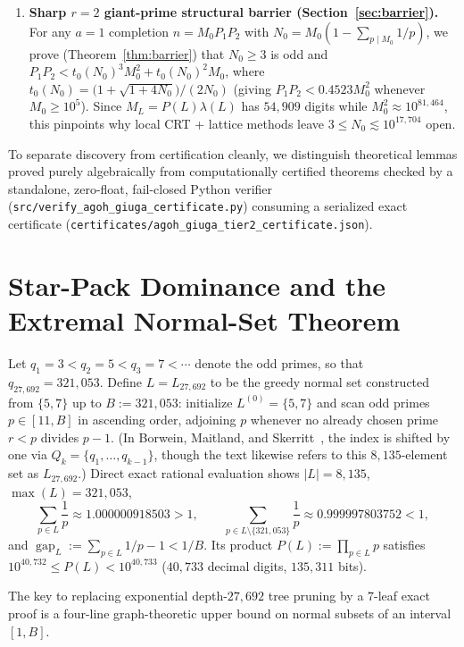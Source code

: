 \documentclass[11pt]{article}
\theoremstyle{remark}
\newcommand{\gap}{\operatorname{gap}}
\begin{document}
\begin{enumerate}
  \item \textbf{Sharp $r=2$ giant-prime structural barrier
  (Section~\ref{sec:barrier}).} For any $a = 1$ completion $n = M_0 P_1 P_2$
  with $N_0 = M_0(1 - \sum_{p\mid M_0} 1/p)$, we prove
  (Theorem~\ref{thm:barrier}) that $N_0 \ge 3$ is odd and
  $P_1 P_2 < t_0(N_0)^3 M_0^2 + t_0(N_0)^2 M_0$, where
  $t_0(N_0) = \bigl(1 + \sqrt{1+4N_0}\bigr)/(2N_0)$ (giving
  $P_1 P_2 < 0.4523 M_0^2$ whenever $M_0 \ge 10^5$). Since
  $M_L = P(L)\lambda(L)$ has $54{,}909$ digits while $M_0^2 \approx 10^{81{,}464}$,
  this pinpoints why local CRT + lattice methods leave
  $3 \le N_0 \lesssim 10^{17{,}704}$ open.
\end{enumerate}

To separate discovery from certification cleanly, we distinguish theoretical
lemmas proved purely algebraically from computationally certified theorems
checked by a standalone, zero-float, fail-closed Python verifier
(\texttt{src/verify\_agoh\_giuga\_certificate.py}) consuming a serialized exact
certificate (\texttt{certificates/agoh\_giuga\_tier2\_certificate.json}).

\section{Star-Pack Dominance and the Extremal Normal-Set Theorem}
\label{sec:starpack}

Let $q_1 = 3 < q_2 = 5 < q_3 = 7 < \cdots$ denote the odd primes, so that
$q_{27,692} = 321{,}053$. Define $L = L_{27,692}$ to be the greedy normal set
constructed from $\{5,7\}$ up to $B := 321{,}053$: initialize $L^{(0)} = \{5,7\}$
and scan odd primes $p \in [11, B]$ in ascending order, adjoining $p$ whenever
no already chosen prime $r < p$ divides $p - 1$. (In Borwein, Maitland, and
Skerritt~\cite[Definition~11]{DBLP:journals/int/BorweinMS13}, the index is
shifted by one via $Q_k = \{q_1,\dots,q_{k-1}\}$, though the text likewise
refers to this $8{,}135$-element set as $L_{27,692}$.) Direct exact rational
evaluation shows $|L| = 8{,}135$, $\max(L) = 321{,}053$,
\[
  \sum_{p \in L} \frac{1}{p} \approx 1.000000918503 > 1,
  \qquad
  \sum_{p \in L \setminus \{321{,}053\}} \frac{1}{p} \approx 0.999997803752 < 1,
\]
and $\gap_L := \sum_{p\in L} 1/p - 1 < 1/B$. Its product $P(L) := \prod_{p\in L} p$
satisfies $10^{40{,}732} \le P(L) < 10^{40{,}733}$ ($40{,}733$ decimal digits,
$135{,}311$ bits).

The key to replacing exponential depth-$27{,}692$ tree pruning by a $7$-leaf
exact proof is a four-line graph-theoretic upper bound on normal subsets of an
interval $[1,B]$.
\end{document}
